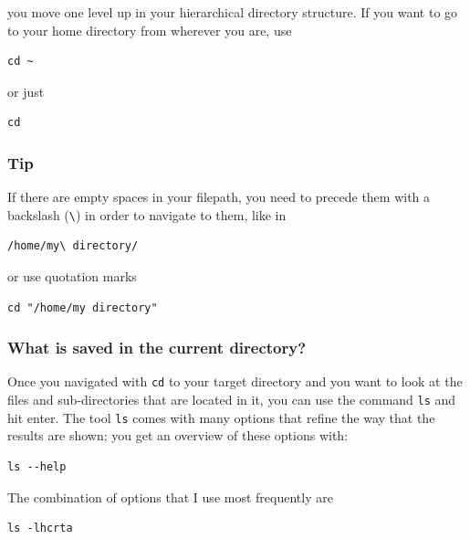 \documentclass[11pt]{article}
\begin{document}
you move one level up in your hierarchical directory structure.  If
you want to go to your home directory from wherever you are, use

\begin{verbatim}
cd ~
\end{verbatim}

or just

\begin{verbatim}
cd
\end{verbatim}

\subsubsection{Tip}
\label{sec-2-1-3}
If there are empty spaces in your filepath, you need to precede them
with a backslash (\texttt{\textbackslash{}}) in order to navigate to them, like in 

\begin{verbatim}
/home/my\ directory/
\end{verbatim}

or use quotation marks

\begin{verbatim}
cd "/home/my directory"
\end{verbatim}

\subsubsection{What is saved in the current directory?}
\label{sec-2-1-4}
Once you navigated with \texttt{cd} to your target directory and you want to
look at the files and sub-directories that are located in it, you can
use the command \texttt{ls} and hit enter. The tool \texttt{ls} comes with many
options that refine the way that the results are shown; you get an
overview of these options with:

\begin{verbatim}
ls --help
\end{verbatim}

The combination of options that I use most frequently are

\begin{verbatim}
ls -lhcrta
\end{verbatim}
\end{document}
